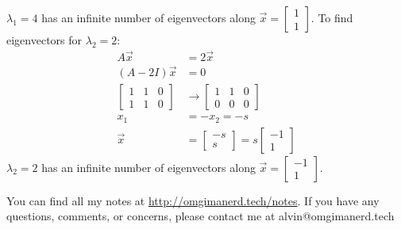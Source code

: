\documentclass{math}
\begin{document}
\( \lambda_1 = 4 \) has an infinite number of eigenvectors along \( \vec{x} =
\begin{bmatrix}1 \\ 1\end{bmatrix} \). To find eigenvectors for \( \lambda_2 =
2 \):
\begin{align*}
  A\vec{x} &= 2\vec{x} \\
  (A-2I)\vec{x} &= 0 \\
  \begin{bmatrix}
    1 & 1 & 0 \\
    1 & 1 & 0
  \end{bmatrix} &\to \begin{bmatrix}
    1 & 1 & 0 \\
    0 & 0 & 0
  \end{bmatrix} \\
  x_1 &= -x_2 = -s \\
  \vec{x} &= \begin{bmatrix}-s \\ s\end{bmatrix} =
    s\begin{bmatrix}-1 \\ 1\end{bmatrix}
\end{align*}
\( \lambda_2 = 2 \) has an infinite number of eigenvectors along \( \vec{x} =
\begin{bmatrix}-1 \\ 1\end{bmatrix} \).

\begin{center}
  You can find all my notes at \url{http://omgimanerd.tech/notes}. If you have
  any questions, comments, or concerns, please contact me at
  alvin@omgimanerd.tech
\end{center}
\end{document}

